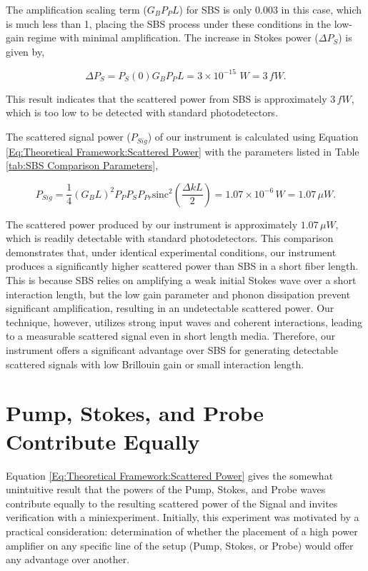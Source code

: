 \documentclass[%
  reprint,
  superscriptaddress,
  amsmath,amssymb,
  aps,
  prapplied,
]{revtex4-2}
\begin{document}
The amplification scaling term ($G_{B}P_{P}L$) for SBS is only 0.003 in this case, which is much less than 1, placing the SBS process under these conditions in the low-gain regime with minimal amplification. The increase in Stokes power ($\Delta P_{S}$) is given by,

\begin{equation}
\Delta P_{S} = P_{S}(0)G_{B}P_{P}L = 3 \times 10^{-15}\, \, W = 3 \, fW.
\end{equation}

This result indicates that the scattered power from SBS is approximately $3 \, fW$, which is too low to be detected with standard photodetectors.

The scattered signal power ($P_{Sig}$) of our instrument is calculated using Equation \ref{Eq:Theoretical Framework:Scattered Power} with the parameters listed in Table \ref{tab:SBS Comparison Parameters},

\begin{equation}
P_{Sig} = \frac{1}{4}\left(G_{B}L\right)^{2}P_{P}P_{S}P_{Pr}\text{sinc}^{2}\left(\frac{\Delta k L}{2}\right) = 1.07\times10^{-6} \, W = 1.07 \, \mu W.
\end{equation}


The scattered power produced by our instrument is approximately $1.07 \, \mu W$, which is readily detectable with standard photodetectors. This comparison demonstrates that, under identical experimental conditions, our instrument produces a significantly higher scattered power than SBS in a short fiber length. This is because SBS relies on amplifying a weak initial Stokes wave over a short interaction length, but the low gain parameter and phonon dissipation prevent significant amplification, resulting in an undetectable scattered power. Our technique, however, utilizes strong input waves and coherent interactions, leading to a measurable scattered signal even in short length media. Therefore, our instrument offers a significant advantage over SBS for generating detectable scattered signals with low Brillouin gain or small interaction length.


\newpage

\section{Pump, Stokes, and Probe Contribute Equally}

Equation \ref{Eq:Theoretical Framework:Scattered Power} gives the somewhat unintuitive result that the powers of the Pump, Stokes, and Probe waves contribute equally to the resulting scattered power of the Signal and invites verification with a miniexperiment. Initially, this experiment was motivated by a practical consideration: determination of whether the placement of a high power amplifier on any specific line of the setup (Pump, Stokes, or Probe) would offer any advantage over another.
\end{document}
